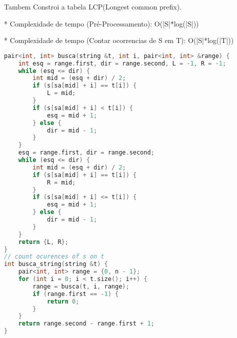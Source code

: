 \documentclass[11pt, a4paper, oneside]{book}
\begin{document}
Tambem Constroi a tabela LCP(Longest common prefix).



* Complexidade de tempo (Pré-Processamento): O(|S|*log(|S|))

* Complexidade de tempo (Contar ocorrencias de S em T): O(|S|*log(|T|))
\hfill

\begin{multicols}{2}
\begin{lstlisting}[language=C++]
pair<int, int> busca(string &t, int i, pair<int, int> &range) {
    int esq = range.first, dir = range.second, L = -1, R = -1;
    while (esq <= dir) {
        int mid = (esq + dir) / 2;
        if (s[sa[mid] + i] == t[i]) {
            L = mid;
        }
        if (s[sa[mid] + i] < t[i]) {
            esq = mid + 1;
        } else {
            dir = mid - 1;
        }
    }
    esq = range.first, dir = range.second;
    while (esq <= dir) {
        int mid = (esq + dir) / 2;
        if (s[sa[mid] + i] == t[i]) {
            R = mid;
        }
        if (s[sa[mid] + i] <= t[i]) {
            esq = mid + 1;
        } else {
            dir = mid - 1;
        }
    }
    return {L, R};
}
// count ocurences of s on t
int busca_string(string &t) {
    pair<int, int> range = {0, n - 1};
    for (int i = 0; i < t.size(); i++) {
        range = busca(t, i, range);
        if (range.first == -1) {
            return 0;
        }
    }
    return range.second - range.first + 1;
}\end{lstlisting}
\end{multicols}

\hfill
\end{document}
